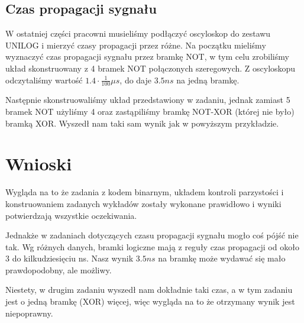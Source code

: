 \documentclass[a4paper,11pt]{article}
\begin{document}
\subsection{Czas propagacji sygnału}

W ostatniej części pracowni musieliśmy podłączyć oscyloskop do zestawu UNILOG i mierzyć czasy propagacji przez różne.
Na początku mieliśmy wyznaczyć czas propagacji sygnału przez bramkę NOT, w tym celu zrobiliśmy układ skonstruowany z 4 bramek NOT połączonych szeregowych. Z oscyloskopu odczytaliśmy wartość $1.4 \cdot \frac{1}{100} \mu s$, do daje $3.5 ns$ na jedną bramkę.

Następnie skonstruowaliśmy układ przedstawiony w zadaniu, jednak zamiast 5 bramek NOT użyliśmy 4 oraz zastąpiliśmy bramkę NOT-XOR (której nie było) bramką XOR. Wyszedł nam taki sam wynik jak w powyższym przykładzie.

\section{Wnioski}

Wygląda na to że zadania z kodem binarnym, układem kontroli parzystości i konstruowaniem zadanych wykładów zostały wykonane prawidłowo i wyniki potwierdzają wszystkie oczekiwania.

Jednakże w zadaniach dotyczących czasu propagacji sygnału mogło coś pójść nie tak. Wg różnych danych, bramki logiczne mają z reguły czas propagacji od około 3 do kilkudziesięciu ns. Nasz wynik $3.5 ns$ na bramkę może wydawać się mało prawdopodobny, ale możliwy.

Niestety, w drugim zadaniu wyszedł nam dokładnie taki czas, a w tym zadaniu jest o jedną bramkę (XOR) więcej, więc wygląda na to że otrzymany wynik jest niepoprawny.
\end{document}
